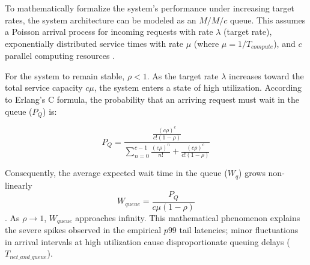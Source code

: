 \documentclass{ieeeaccess}
\begin{document}
To mathematically formalize the system's performance under increasing target rates, the system architecture can be modeled as an $M/M/c$ queue. This assumes a Poisson arrival process for incoming requests with rate $\lambda$ (target rate), exponentially distributed service times with rate $\mu$ (where $\mu = 1 / T_{compute}$), and $c$ parallel computing resources \cite{tijms2003first} \cite{Banerjee2023MTDDHJSMTA}.

For the system to remain stable, $\rho < 1$. As the target rate $\lambda$ increases toward the total service capacity $c\mu$, the system enters a state of high utilization. According to Erlang's C formula, the probability that an arriving request must wait in the queue ($P_Q$) is:

\begin{equation}
	P_Q = \frac{\frac{(c\rho)^c}{c!(1-\rho)}}{\sum_{n=0}^{c-1} \frac{(c\rho)^n}{n!} + \frac{(c\rho)^c}{c!(1-\rho)}}
\end{equation}

Consequently, the average expected wait time in the queue ($W_q$) grows non-linearly $$W_{queue} = \frac{P_Q}{c\mu(1-\rho)}$$. As $\rho \to 1$, $W_{queue}$ approaches infinity. This mathematical phenomenon explains the severe spikes observed in the empirical $p99$ tail latencies; minor fluctuations in arrival intervals at high utilization cause disproportionate queuing delays ($T_{net\_and\_queue}$).
\end{document}
